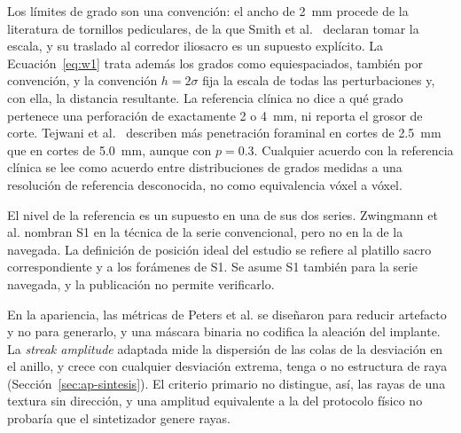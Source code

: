 Los límites de grado son una convención: el ancho de 2~mm procede de la literatura de tornillos pediculares, de la que Smith et al.~\cite{smith2006iliosacral} declaran tomar la escala, y su traslado al corredor iliosacro es un supuesto explícito. La Ecuación~\eqref{eq:w1} trata además los grados como equiespaciados, también por convención, y la convención $h = 2\sigma$ fija la escala de todas las perturbaciones y, con ella, la distancia resultante. La referencia clínica no dice a qué grado pertenece una perforación de exactamente 2 o 4~mm, ni reporta el grosor de corte. Tejwani et al.~\cite{tejwani2014} describen más penetración foraminal en cortes de 2.5~mm que en cortes de 5.0~mm, aunque con $p = 0.3$. Cualquier acuerdo con la referencia clínica se lee como acuerdo entre distribuciones de grados medidas a una resolución de referencia desconocida, no como equivalencia vóxel a vóxel.

El nivel de la referencia es un supuesto en una de sus dos series. Zwingmann et al. nombran S1 en la técnica de la serie convencional, pero no en la de la navegada. La definición de posición ideal del estudio se refiere al platillo sacro correspondiente y a los forámenes de S1. Se asume S1 también para la serie navegada, y la publicación no permite verificarlo.

En la apariencia, las métricas de Peters et al. se diseñaron para reducir artefacto y no para generarlo, y una máscara binaria no codifica la aleación del implante. La \emph{streak amplitude} adaptada mide la dispersión de las colas de la desviación en el anillo, y crece con cualquier desviación extrema, tenga o no estructura de raya (Sección~\ref{sec:ap-sintesis}). El criterio primario no distingue, así, las rayas de una textura sin dirección, y una amplitud equivalente a la del protocolo físico no probaría que el sintetizador genere rayas.  

